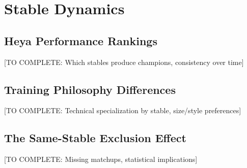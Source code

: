 \section{Stable Dynamics}

\subsection{Heya Performance Rankings}

[TO COMPLETE: Which stables produce champions, consistency over time]

\subsection{Training Philosophy Differences}

[TO COMPLETE: Technical specialization by stable, size/style preferences]

\subsection{The Same-Stable Exclusion Effect}

[TO COMPLETE: Missing matchups, statistical implications]